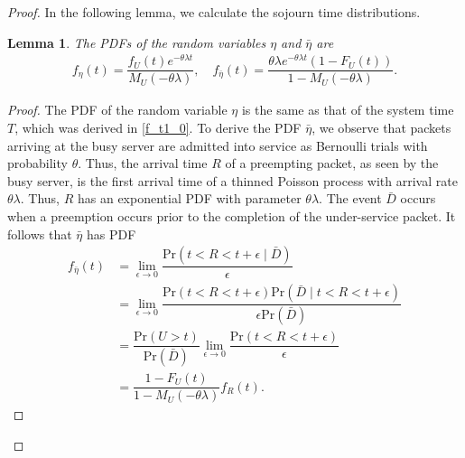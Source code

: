\documentclass[conference]{IEEEtran}
\newtheorem{lemm}{Lemma}
\newcommand{\nn}{\nonumber\\}
\newcommand{\Dbar}{\bar{D}}
\begin{document}
\begin{proof}
In the following lemma, we calculate the sojourn time distributions. 
\begin{lemm}\label{lemmfaap}
The PDFs of the random variables $\eta$ and $\bar\eta$ are %
\begin{align}
f_{\eta}(t)=\dfrac{f_U(t)e^{-\theta\lambda t}}{M_{U}(-\theta\lambda)},
\quad
f_{\bar\eta}(t)=\dfrac{\theta\lambda e^{-\theta\lambda t}(1-F_U(t))}{1-M_{U}(-\theta\lambda)}.
\end{align}
\end{lemm}
\begin{proof}
The PDF of the random variable $\eta$ is the same as that of  the system time $T$, which was derived in \eqref{f_t1_0}.
To derive the PDF $\bar\eta$, we observe that packets arriving at the busy server are admitted into service as Bernoulli trials with probability $\theta$. Thus, the arrival time $R$ of a preempting packet, as  seen by the busy server, is the first arrival time of a thinned Poisson process with arrival rate $\theta\lambda$. Thus, $R$ has an exponential PDF with parameter $\theta\lambda$.
The event $\Dbar$ occurs when a preemption occurs prior to the completion of the under-service packet. It follows that
%
%
$\bar\eta$ has PDF 
\begin{align}\nonumber
f_{\bar\eta}(t)
&\stackrel{}{=}\lim_{\epsilon\rightarrow 0}\dfrac{\mathrm{Pr}(t<R<t+\epsilon\mid \Dbar)}{\epsilon}\\&\nonumber
=\lim_{\epsilon\rightarrow 0}\dfrac{\mathrm{Pr}(t<R<t+\epsilon)\mathrm{Pr}(\Dbar\mid t<R<t+\epsilon)}{\epsilon\mathrm{Pr}(\Dbar)}\nn
&=\dfrac{\mathrm{Pr}(U>t)}{\mathrm{Pr}(\Dbar)}\lim_{\epsilon\rightarrow 0}\dfrac{\mathrm{Pr}(t<R<t+\epsilon)}{\epsilon}\nn
&\label{f_t1}
=\dfrac{1-F_U(t)}{1-M_{U}(-\theta\lambda)}
f_R(t).
\end{align}

\end{proof}
\end{proof}
\end{document}
